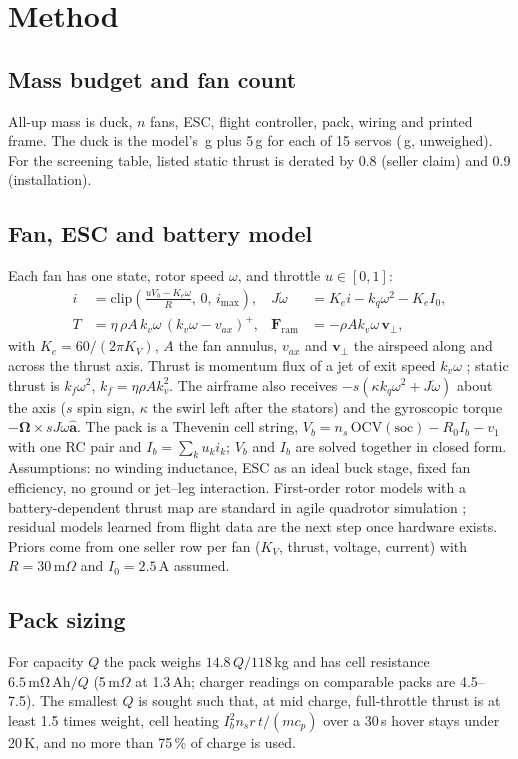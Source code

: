 \documentclass[11pt]{article}
\begin{document}
\section{Method}
\subsection{Mass budget and fan count}
All-up mass is duck, $n$ fans, ESC, flight controller, pack, wiring and printed frame. The duck is
the model's \flDuckModelG\,g plus 5\,g for each of 15 servos (\flDuckG\,g, unweighed). For the
screening table, listed static thrust is derated by 0.8 (seller claim) and 0.9 (installation).

\subsection{Fan, ESC and battery model}\label{sec:model}
Each fan has one state, rotor speed $\omega$, and throttle $u\in[0,1]$:
\begin{align}
i &= \mathrm{clip}\!\left(\frac{u V_b - K_e\omega}{R},\,0,\,i_{\max}\right), &
J\dot\omega &= K_e i - k_q\omega^2 - K_e I_0, \\
T &= \eta\,\rho A\,k_v\omega\,(k_v\omega - v_{ax})^+, &
\mathbf F_{\mathrm{ram}} &= -\rho A k_v\omega\,\mathbf v_\perp ,
\end{align}
with $K_e = 60/(2\pi K_V)$, $A$ the fan annulus, $v_{ax}$ and $\mathbf v_\perp$ the airspeed along and
across the thrust axis. Thrust is momentum flux of a jet of exit speed $k_v\omega$ \cite{leishman,pereira};
static thrust is $k_f\omega^2$, $k_f=\eta\rho A k_v^2$. The airframe also receives
$-s(\kappa k_q\omega^2 + J\dot\omega)$ about the axis ($s$ spin sign, $\kappa$ the swirl left after
the stators) and the gyroscopic torque $-\boldsymbol\Omega\times sJ\omega\hat{\mathbf a}$. The pack is
a Thevenin cell string, $V_b = n_s\,\mathrm{OCV}(\mathrm{soc}) - R_0 I_b - v_1$ with one RC pair and
$I_b=\sum_k u_k i_k$; $V_b$ and $I_b$ are solved together in closed form. Assumptions: no winding
inductance, ESC as an ideal buck stage, fixed fan efficiency, no ground or jet--leg interaction.
First-order rotor models with a battery-dependent thrust map are standard in agile quadrotor
simulation \cite{agilicious,ferede}; residual models learned from flight data \cite{neurobem,swift}
are the next step once hardware exists. Priors come from one seller row per fan
($K_V$, thrust, voltage, current) with $R=30$\,m$\Omega$ and $I_0=2.5$\,A assumed.

\subsection{Pack sizing}
For capacity $Q$ the pack weighs $14.8\,Q/118$\,kg and has cell resistance $6.5\,\mathrm{m\Omega\,Ah}/Q$
(5\,m$\Omega$ at 1.3\,Ah; charger readings on comparable packs are 4.5--7.5). The smallest $Q$ is
sought such that, at mid charge, full-throttle thrust is at least 1.5 times weight, cell heating
$I_b^2 n_s r\,t/(m c_p)$ over a 30\,s hover stays under 20\,K, and no more than 75\,\% of charge is
used.
\end{document}
